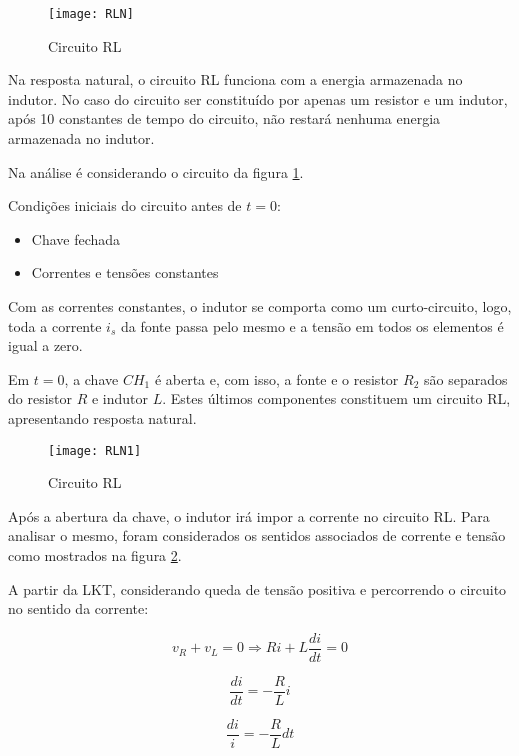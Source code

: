 \documentclass[12pt,fleqn]{book} %
\begin{document}
{        \begin{figure}[!htbp] \centering\texttt{[image: RLN]}
            \caption{Circuito RL}\label{RLN} 
        \end{figure} 
        
        Na resposta natural, o circuito RL funciona com a energia armazenada no indutor. No caso do circuito ser constituído por apenas um resistor e um indutor, após 10 constantes de tempo do circuito, não restará nenhuma energia armazenada no indutor.
        
Na análise é considerando o circuito da figura \ref{RLN}.

Condições iniciais do circuito antes de $t=0$:

\begin{itemize}
\item Chave fechada
\item Correntes e tensões constantes
\end{itemize}
        
Com as correntes constantes, o indutor se comporta como um curto-circuito, logo, toda a corrente $i_s$ da fonte passa pelo mesmo e a tensão em todos os elementos é igual a zero.

Em $t=0$, a chave $CH_1$ é aberta e, com isso, a fonte e o resistor $R_2$ são separados do resistor $R$ e indutor $L$. Estes últimos componentes constituem um circuito RL, apresentando resposta natural.

\begin{figure}[!htbp] \centering\texttt{[image: RLN1]}
            \caption{Circuito RL}\label{RLN1} 
        \end{figure} 

Após a abertura da chave, o indutor irá impor a corrente no circuito RL. Para analisar o mesmo, foram considerados os sentidos associados de corrente e tensão como mostrados na figura \ref{RLN1}.

A partir da LKT, considerando queda de tensão positiva e percorrendo o circuito no sentido da corrente:

\begin{equation}
v_R+v_L=0  \Rightarrow Ri+L\frac{di}{dt}=0
\end{equation}

\begin{equation}
\frac{di}{dt}=-\frac{R}{L}i
\end{equation}

\begin{equation}
\frac{di}{i}=-\frac{R}{L}dt
\end{equation}

}
\end{document}
